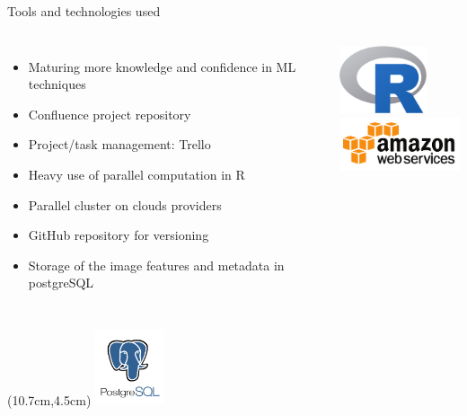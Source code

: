 \documentclass[10pt,fleqn]{beamer}\usepackage[]{graphicx}\usepackage[]{color}
\begin{document}
\begin{frame}{Tools and technologies used}

\begin{columns}
\begin{itemize}
\item{Maturing more knowledge and confidence in ML techniques}
\item{Confluence project repository}
\item{Project/task management: Trello}
\item{Heavy use of parallel computation in R}
\item{Parallel cluster on clouds providers}
\item{GitHub repository for versioning}
\item{Storage of the image features and metadata in postgreSQL}
\end{itemize}

\includegraphics[height=2cm]{figure/R_logo}\\
\vspace{0.5cm}
\includegraphics[width=4cm]{figure/aws}\\
\end{columns}


\begin{textblock*}{2cm}(10.7cm,4.5cm)
\includegraphics[width=2cm]{figure/postgresql_logo}
\end{textblock*}



\end{frame}
\end{document}
